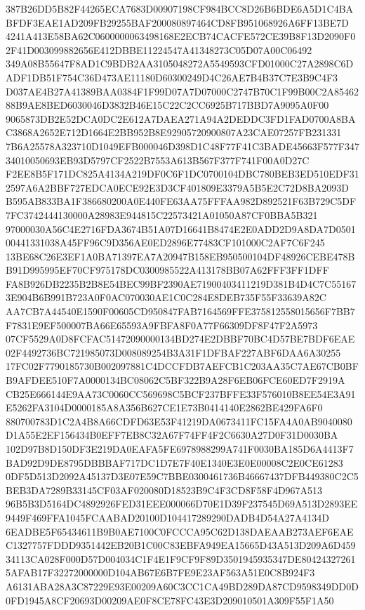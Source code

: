 \documentclass[UTF8,fontset=fandol,zihao=-4,a4paper]{ctexart}
\begin{document}
{{387B26DD5B82F44265ECA7683D00907198CF984BCC8D26B6BDE6A5D1C4BABFDF3EAE1AD209FB29255BAF200080897464CD8FB951068926A6FF13BE7D
4241A413E58BA62C0600000063498168E2ECB74CACFE572CE39B8F13D2090F02F41D003099882656E412DBBE11224547A41348273C05D07A00C06492
349A08B55647F8AD1C9BDB2AA3105048272A5549593CFD01000C27A2898C6DADF1DB51F754C36D473AE11180D60300249D4C26AE7B4B37C7E3B9C4F3
D037AE4B27A41389BAA0384F1F99D07A7D07000C2747B70C1F99B00C2A8546288B9AE8BED6030046D3832B46E15C22C2CC6925B717BBD7A9095A0F00
9065873DB2E52DCA0DC2E612A7DAEA271A94A2DEDDC3FD1FAD0700A8BAC3868A2652E712D1664E2BB952B8E92905720900807A23CAE07257FB231331
7B6A25578A323710D1049EFB000046D398D1C48F77F41C3BADE45663F577F34734010050693EB93D5797CF2522B7553A613B567F377F741F00A0D27C
F2EE8B5F171DC825A4134A219DF0C6F1DC0700104DBC780BEB3ED510EDF312597A6A2BBF727EDCA0ECE92E3D3CF401809E3379A5B5E2C72D8BA2093D
B595AB833BA1F386680200A0E440FE63AA75FFFAA982D892521F63B729C5DF7FC3742444130000A28983E944815C22573421A01050A87CF0BBA5B321
97000030A56C4E2716FDA3674B51A07D16641B8474E2E0ADD2D9A8DA7D050100441331038A45FF96C9D356AE0ED2896E77483CF101000C2AF7C6F245
13BE68C26E3EF1A0BA71397EA7A20947B158EB950500104DF48926CEBE478BB91D995995EF70CF975178DC0300985522A413178BB07A62FFF3FF1DFF
FA8B926DB2235B2B8E54BEC99BF2390AE71900403411219D381B4D4C7C551673E904B6B991B723A0F0AC070030AE1C0C284E8DEB735F55F33639A82C
AA7CB7A44540E1590F00605CD950847FAB7164569FFE375812558015656F7BB7F7831E9EF500007BA66E65593A9FBFA8F0A77F66309DF8F47F2A5973
07CF5529A0D8FCFAC51472090000134BD274E2DBBF70BC4D57BE7BDF6EAE02F4492736BC721985073D008089254B3A31F1DFBAF227ABF6DAA6A30255
17FC02F7790185730B002097881C4DCCFDB7AEFCB1C203AA35C7AE67CB0BFB9AFDEE510F7A0000134BC08062C5BF322B9A28F6EB06FCE60ED7F2919A
CB25E666144E9AA73C0060CC569698C5BCF237BFFE33F576010B8EE54E3A91E5262FA3104D0000185A8A356B627CE1E73B0414140E2862BE429FA6F0
880700783D1C2A4B8A66CDFD63E53F41219DA0673411FC15FA4A0AB9040080D1A55E2EF156434B0EFF7EB8C32A67F74FF4F2C6630A27D0F31D0030BA
102D97B8D150DF3E219DA0EAFA5FE6978988299A741F0030BA185D6A4413F7BAD92D9DE8795DBBBAF717DC1D7E7F40E1340E3E0E00008C2E0CE61283
0DF5D513D2092A45137D3E07E59C7BBE0300461736B46667437DFB449380C2C5BEB3DA7289B33145CF03AF020080D18523B9C4F3CD8F58F4D967A513
96B5B3D5164DC4892926FED31EEE000066D70E1D39F237545D69A513D2893EE9449F469FFA1045FCAABAD20100D104417289290DADB4D54A27A4134D
6EADBE5F65434611B9B0AE7100C0FCCCA95C62D138DAEAAB273AEF6EAEC1327757FDDD9351442EB20B1C00C83EBFA949EA15665D43A513D209A6D459
34113CA028F000D57D004034C1F4E1F9CF9F89D3501945935347DE804243272615AFAB17F32272000000D104AB67E6B7FE9E23AF563A51E0C8B924F3
A6131ABA28A3C87229E93E00209A60C3CC1CA49BD289DA87CD9598349DD0D0FD1945A8CF20693D00209AE0F8CE78FC43E3D209010501A309F55F1A50
}}
\end{document}
